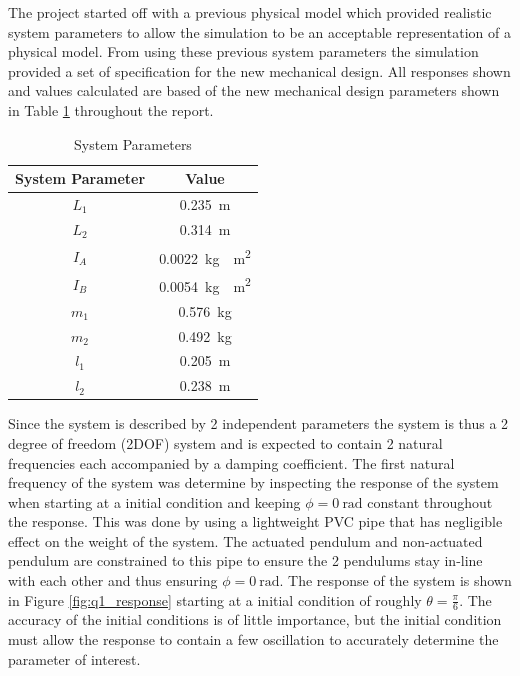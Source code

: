 The project started off with a previous physical model which provided realistic system parameters to allow the simulation to be an acceptable representation of a physical model. From using these previous system parameters the simulation provided a set of specification for the new mechanical design. All responses shown and values calculated are based of the new mechanical design parameters shown in Table \ref{table:system_param} throughout the report.\\


		\begin{table}[]
	\centering
	\begin{tabular}{|c|c|}
		\hline
		System Parameter & Value \\
		\hline
		\hline
		$L_{1}$ & \SI{0.235}{m} \\
		\hline
		$L_{2}$ & \SI{0.314}{m} \\ 
		\hline
		$I_{A}$ & \SI{ 0.0022}{kg\cdot m^2}\\
		\hline
		$I_{B}$ & \SI{0.0054}{kg\cdot m^2}\\
		\hline
		$m_{1}$ & \SI{0.576}{kg}\\
		\hline
		$m_{2}$ & \SI{0.492}{kg} \\
		\hline
		$l_{1}$ & \SI{0.205}{m}\\
		\hline
		$l_{2}$ & \SI{0.238}{m}\\
		\hline
	\end{tabular}
	\caption{System Parameters}
	\label{table:system_param}
\end{table}


Since the system is described by 2 independent parameters the system is thus a 2 degree of freedom (2DOF) system and is expected to contain 2 natural frequencies each accompanied by a damping coefficient. The first natural frequency of the system was determine by inspecting the response of the system when starting at a initial condition and keeping $\phi = \SI{0}{\radian}$ constant throughout the response. This was done by using a lightweight PVC pipe that has negligible effect on the weight of the system. The actuated pendulum and non-actuated pendulum are constrained to this pipe to ensure the 2 pendulums stay in-line with each other and thus ensuring $\phi = \SI{0}{\radian}$. The response of the system is shown in Figure \ref{fig:q1_response} starting at a initial condition of roughly $\theta = \frac{\pi}{6}$. The accuracy of the initial conditions is of little importance, but the initial condition must allow the response to contain a few oscillation to accurately determine the parameter of interest.\\

